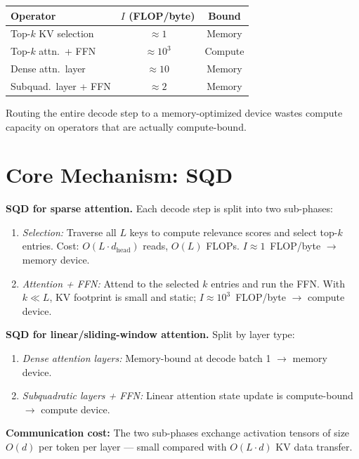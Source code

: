 \documentclass[10pt,twocolumn]{article}
\begin{document}
\begin{center}
\begin{tabular}{lcc}
\toprule
Operator & $I$ (FLOP/byte) & Bound \\
\midrule
Top-$k$ KV selection   & $\approx 1$     & Memory \\
Top-$k$ attn.\ + FFN   & $\approx 10^3$  & Compute \\
Dense attn.\ layer     & $\approx 10$    & Memory \\
Subquad.\ layer + FFN  & $\approx 2$     & Memory \\
\bottomrule
\end{tabular}
\end{center}

Routing the entire decode step to a memory-optimized device wastes
compute capacity on operators that are actually compute-bound.

\section{Core Mechanism: SQD}

\textbf{SQD for sparse attention.} Each decode step is split into two
sub-phases:
\begin{enumerate}[itemsep=2pt,topsep=2pt]
  \item \textit{Selection:} Traverse all $L$ keys to compute relevance
    scores and select top-$k$ entries. Cost: $O(L\cdot d_\text{head})$
    reads, $O(L)$ FLOPs. $I \approx 1$~FLOP/byte $\to$ memory device.
  \item \textit{Attention + FFN:} Attend to the selected $k$ entries
    and run the FFN. With $k \ll L$, KV footprint is small and static;
    $I \approx 10^3$~FLOP/byte $\to$ compute device.
\end{enumerate}

\textbf{SQD for linear/sliding-window attention.} Split by layer type:
\begin{enumerate}[itemsep=2pt,topsep=2pt]
  \item \textit{Dense attention layers:} Memory-bound at decode
    batch 1 $\to$ memory device.
  \item \textit{Subquadratic layers + FFN:} Linear attention state
    update is compute-bound $\to$ compute device.
\end{enumerate}

\textbf{Communication cost:} The two sub-phases exchange activation
tensors of size $O(d)$ per token per layer --- small compared with
$O(L\cdot d)$ KV data transfer.
\end{document}
